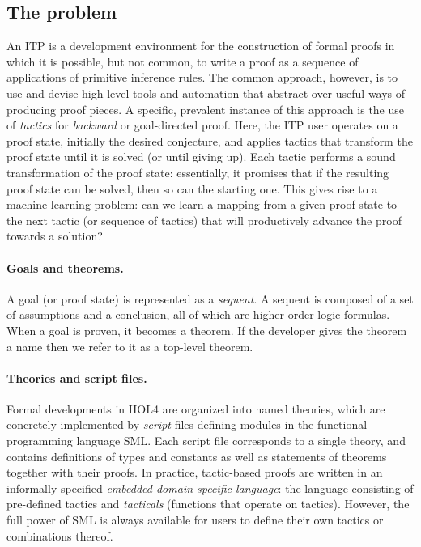 \documentclass[runningheads,a4paper,draft]{svjour3}
\def\holfour{\textsf{HOL4}\xspace}
\def\sml{\textsf{SML}\xspace}
\begin{document}
\subsection{The problem}
An ITP is a development environment for the construction of formal proofs in which it is possible, but not common, to write a proof as a sequence of applications of primitive inference rules.
The common approach, however, is to use and devise high-level tools and automation that abstract over useful ways of producing proof pieces.
A specific, prevalent instance of this approach is the use of \emph{tactics} for \emph{backward} or goal-directed proof.
Here, the ITP user operates on a proof state, initially the desired conjecture, and applies tactics that transform the proof state until it is solved (or until giving up).
Each tactic performs a sound transformation of the proof state: essentially, it promises that if the resulting proof state can be solved, then so can the starting one.
This gives rise to a machine learning problem: can we learn a mapping from a given proof state to the next tactic (or sequence of tactics) that will productively advance the proof towards a solution?

\paragraph{Goals and theorems.}
A goal (or proof state) is represented as a \emph{sequent}.
A sequent is composed of a set of assumptions and a conclusion, all of which are higher-order logic formulas.
When a goal is proven, it becomes a theorem.
If the developer gives the theorem a name then we refer to it as a top-level theorem.

\paragraph{Theories and script files.}
Formal developments in \holfour are organized into named theories, which are
concretely implemented by \emph{script} files defining modules in the
functional programming language \sml.
Each script file corresponds to a single theory, and contains definitions of
types and constants as well as statements of theorems together with their
proofs.
In practice, tactic-based proofs are written in an informally specified
\emph{embedded domain-specific language}: the language consisting of
pre-defined tactics and \emph{tacticals} (functions that operate on tactics).
However, the full power of \sml is always available for users to define their
own tactics or combinations thereof.
\end{document}
